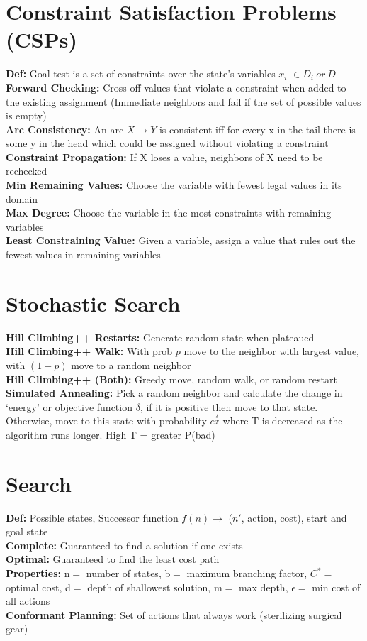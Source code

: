 \documentclass[10pt, a4paper]{article}
\begin{document}
\begin{multicols*}{1}
        \section*{Constraint Satisfaction Problems (CSPs)}
            \textbf{Def:} Goal test is a set of constraints over the state's variables $x_i$ $\in D_i\ or\ D$\\
            \textbf{Forward Checking:} Cross off values that violate a constraint when added to the existing assignment (Immediate neighbors and fail if the set of possible values is empty)\\
            \textbf{Arc Consistency:} An arc $X \to Y$ is consistent iff for every x in the tail there is some y in the head which could be assigned without violating a constraint\\
            \textbf{Constraint Propagation:} If X loses a value, neighbors of X need to be rechecked\\
            \textbf{Min Remaining Values:} Choose the variable with fewest legal values in its domain\\
            \textbf{Max Degree:} Choose the variable in the most constraints with remaining variables\\
            \textbf{Least Constraining Value:} Given a variable, assign a value that rules out the fewest values in remaining variables
        \section*{Stochastic Search}
            \textbf{Hill Climbing++ Restarts:} Generate random state when plateaued\\
            \textbf{Hill Climbing++ Walk:} With prob $p$ move to the neighbor with largest value, with $(1 - p)$ move to a random neighbor\\
            \textbf{Hill Climbing++ (Both):} Greedy move, random walk, or random restart\\
            \textbf{Simulated Annealing:} Pick a random neighbor and calculate the change in `energy' or objective function $\delta$, if it is positive then move to that state. Otherwise, move to this state with probability $e^\frac{\delta}{T}$ where T is decreased as the algorithm runs longer. High T = greater P(bad)
        \section*{Search}
            \textbf{Def:} Possible states, Successor function $f(n) \to$ ($n'$, action, cost), start and goal state\\
            \textbf{Complete:} Guaranteed to find a solution if one exists\\
            \textbf{Optimal:} Guaranteed to find the least cost path\\
            \textbf{Properties:} n$ =$ number of states, b$ =$ maximum branching factor, $C^*$$ =$ optimal cost, d$ =$ depth of shallowest solution, m$ =$ max depth, $\epsilon =$ min cost of all actions\\
            \textbf{Conformant Planning:} Set of actions that always work (sterilizing surgical gear)

\end{multicols*}
\end{document}
